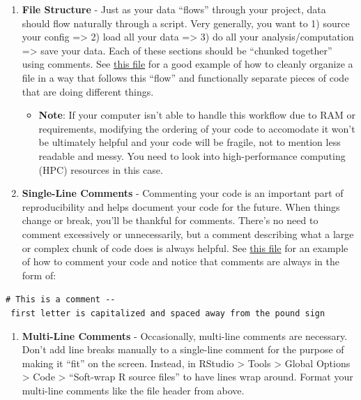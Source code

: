 \documentclass[]{book}
\providecommand{\tightlist}{%
  \setlength{\itemsep}{0pt}\setlength{\parskip}{0pt}}
\begin{document}
\begin{enumerate}
\def\labelenumi{\arabic{enumi}.}
\setcounter{enumi}{1}
\tightlist
\item
  \textbf{File Structure} - Just as your data ``flows'' through your project, data should flow naturally through a script. Very generally, you want to 1) source your config =\textgreater{} 2) load all your data =\textgreater{} 3) do all your analysis/computation =\textgreater{} save your data. Each of these sections should be ``chunked together'' using comments. See \href{https://github.com/kmishra9/Flu-Absenteeism/blob/master/Master's\%20Thesis\%20-\%20Spatial\%20Epidemiology\%20of\%20Influenza/2a\%20-\%20Statistical-Inputs.R}{this file} for a good example of how to cleanly organize a file in a way that follows this ``flow'' and functionally separate pieces of code that are doing different things.

  \begin{itemize}
  \tightlist
  \item
    \textbf{Note}: If your computer isn't able to handle this workflow due to RAM or requirements, modifying the ordering of your code to accomodate it won't be ultimately helpful and your code will be fragile, not to mention less readable and messy. You need to look into high-performance computing (HPC) resources in this case.
  \end{itemize}
\item
  \textbf{Single-Line Comments} - Commenting your code is an important part of reproducibility and helps document your code for the future. When things change or break, you'll be thankful for comments. There's no need to comment excessively or unnecessarily, but a comment describing what a large or complex chunk of code does is always helpful. See \href{https://github.com/kmishra9/Flu-Absenteeism/blob/master/Master's\%20Thesis\%20-\%20Spatial\%20Epidemiology\%20of\%20Influenza/1b\%20-\%20Map-Management.R}{this file} for an example of how to comment your code and notice that comments are always in the form of:
\end{enumerate}

\texttt{\#\ This\ is\ a\ comment\ -\/-\ first\ letter\ is\ capitalized\ and\ spaced\ away\ from\ the\ pound\ sign}

\begin{enumerate}
\def\labelenumi{\arabic{enumi}.}
\setcounter{enumi}{3}
\tightlist
\item
  \textbf{Multi-Line Comments} - Occasionally, multi-line comments are necessary. Don't add line breaks manually to a single-line comment for the purpose of making it ``fit'' on the screen. Instead, in RStudio \textgreater{} Tools \textgreater{} Global Options \textgreater{} Code \textgreater{} ``Soft-wrap R source files'' to have lines wrap around. Format your multi-line comments like the file header from above.
\end{enumerate}
\end{document}
